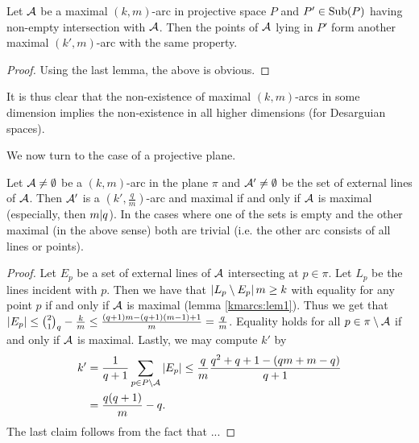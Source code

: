 \documentclass[a4paper]{article}
\begin{document}
\begin{lemma}
    Let $\mathcal{A}$ be a maximal $(k,m)$-arc in projective space $P$ and $P'\in\mathop\mathrm{Sub}\nolimits(P)$ having non-empty intersection with $\mathcal{A}$. Then the points of $\mathcal{A}$ lying in $P'$ form another maximal $(k',m)$-arc with the same property.
\end{lemma}

\begin{proof}
    Using the last lemma, the above is obvious.
\end{proof}

It is thus clear that the non-existence of maximal $(k,m)$-arcs in some dimension implies the non-existence in all higher dimensions (for Desarguian spaces).

We now turn to the case of a projective plane.

\begin{lemma}
    Let $\mathcal{A}\neq\emptyset$ be a $(k,m)$-arc in the plane $\pi$ and $\mathcal{A}'\neq\emptyset$ be the set of external lines of $\mathcal{A}$. Then $\mathcal{A}'$ is a $(k',\frac{q}{m})$-arc and maximal if and only if $\mathcal{A}$ is maximal (especially, then $m| q$). In the cases where one of the sets is empty and the other maximal (in the above sense) both are trivial (i.e. the other arc consists of all lines or points). 
\end{lemma}

\begin{proof}
    Let $E_p$ be a set of external lines of $\mathcal{A}$ intersecting at $p\in\pi$. Let $L_p$ be the lines incident with $p$.
    Then we have that $\left|L_p\setminus E_p\right|m\geq k$ with equality for any point $p$ if and only if $\mathcal{A}$ is maximal (lemma \ref{kmarcs:lem1}).
    Thus we get that $\card{E_p}\leq \binom[q]{2}{1}-\frac{k}{m}\leq \frac{(q+1)m-(q+1)(m-1)+1}{m}=\frac{q}{m}$. Equality holds for all $p\in\pi\setminus\mathcal{A}$ if and only if $\mathcal{A}$ is maximal.
    Lastly, we may compute $k'$ by
    \begin{align*}
        k' & = \frac{1}{q+1}\sum_{p\in P\setminus\mathcal{A}}{\left|E_p\right|}\leq \frac{q}{m}\frac{q^2+q+1-(qm+m-q)}{q+1}\\
        & = \frac{q(q+1)}{m}-q\text{.}
    \end{align*}
    The last claim follows from the fact that ...
\end{proof}
\end{document}
